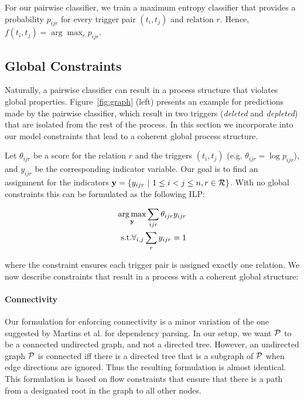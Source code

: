 For our pairwise classifier, we train a maximum entropy classifier that provides a probability $p_{ijr}$ for every trigger pair $(t_i,t_j)$ and relation $r$. Hence, $f(t_i,t_j)= \arg\max_r p_{ijr}$.

\subsection{Global Constraints} \label{subsec:global}

Naturally, a pairwise classifier can result in a process structure that violates global properties. Figure~\ref{fig:graph} (left) presents an example for predictions made by the pairwise classifier, which result in two triggers (\emph{deleted} and \emph{depleted}) that are isolated from the rest of the process. In this section we incorporate into our model constraints that lead to a coherent global process structure.

Let $\theta_{ijr}$ be a score for the relation $r$ and the triggers $(t_i,t_j)$ (e.g. $\theta_{ijr}=\log p_{ijr}$), and $y_{ijr}$ be the corresponding indicator variable. Our goal is to find an assignment for the indicators $\mathbf{y}=\{y_{ijr} \ | \ 1 \leq i < j \leq n, r \in \mathcal{R} \}$. With no global constraints this can be formulated as the following ILP:

\begin{align}
\operatorname*{arg\,max}_{\mathbf{y}} \sum_{ijr} \theta_{ijr} y_{ijr} \\
\mbox{s.t.} \forall_{i,j} \sum_r y_{ijr}=1 \nonumber
\end{align}

\noindent where the constraint ensures each trigger pair is assigned exactly one relation. We now describe constraints that result in a process with a coherent global structure:

\paragraph{Connectivity} 
Our formulation for enforcing connectivity is a minor variation of the one suggested by Martins et al.  for dependency parsing. In our setup, we want $\mathcal{P}$ to be a connected undirected graph, and not a directed tree. However, an undirected graph $\mathcal{P}$ is connected iff there is a directed tree that is a subgraph of $\mathcal{P}$ when edge directions are ignored. Thus the resulting formulation is almost identical. This formulation is based on flow constraints that ensure that there is a path from a designated root in the graph to all other nodes.

